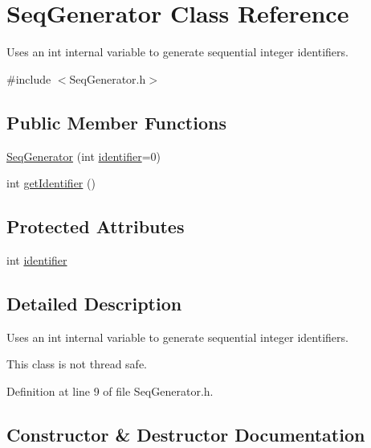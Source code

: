 \hypertarget{class_seq_generator}{}\section{Seq\+Generator Class Reference}
\label{class_seq_generator}


Uses an int internal variable to generate sequential integer identifiers.  




{\ttfamily \#include $<$Seq\+Generator.\+h$>$}

\subsection*{Public Member Functions}
\begin{DoxyCompactItemize}
\item 
\hyperlink{class_seq_generator_a617e02809424b14ab914e66d23d8bcca}{Seq\+Generator} (int \hyperlink{class_seq_generator_ab2da7d7c7ee5a92305ca026c180c2037}{identifier}=0)
\item 
int \hyperlink{class_seq_generator_aff652f8e839fef2162cc47222a99d5db}{get\+Identifier} ()
\end{DoxyCompactItemize}
\subsection*{Protected Attributes}
\begin{DoxyCompactItemize}
\item 
int \hyperlink{class_seq_generator_ab2da7d7c7ee5a92305ca026c180c2037}{identifier}
\end{DoxyCompactItemize}


\subsection{Detailed Description}
Uses an int internal variable to generate sequential integer identifiers. 

This class is not thread safe. 

Definition at line 9 of file Seq\+Generator.\+h.



\subsection{Constructor \& Destructor Documentation}
\mbox{\label{class_seq_generator_a617e02809424b14ab914e66d23d8bcca}} 
